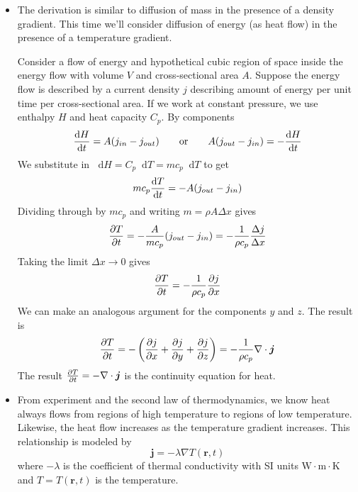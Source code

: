 \documentclass[11pt, a4paper]{article}
\newcommand{\eqtext}[1]{\qquad \text{#1} \qquad}
\newcommand{\diff}{\mathop{}\!\mathrm{d}} %
\begin{document}
\begin{itemize}
	\item The derivation is similar to diffusion of mass in the presence of a density gradient. This time we'll consider diffusion of energy (as heat flow) in the presence of a temperature gradient.
	
	
	Consider a flow of energy and hypothetical cubic region of space inside the energy flow with volume $ V $ and cross-sectional area $ A $. Suppose the energy flow is described by a current density $ j $ describing amount of energy per unit time per cross-sectional area. If we work at constant pressure, we use enthalpy $ H $ and heat capacity $ C_{p} $. By components
	\begin{equation*}
		\dv{H}{t} = A(j_{in} - j_{out}) \eqtext{or} A(j_{out} - j_{in}) = - \dv{H}{t}
	\end{equation*}
	We substitute in $ \diff H = C_{p} \diff T = m c_{p} \diff T$  to get
	\begin{equation*}
		m c_{p}\dv{T}{t}= - A(j_{out} - j_{in})
	\end{equation*}
	Dividing through by $ m c_{p} $ and writing $ m = \rho A \Delta x $ gives
	\begin{equation*}
		\pdv{T}{t} = - \frac{A}{mc_{p}}(j_{out} - j_{in}) = -\frac{1}{\rho c_{p}} \frac{\Delta j}{\Delta x}
	\end{equation*}
	Taking the limit $ \Delta x \to 0 $ gives
	\begin{equation*}
		\pdv{T}{t} = -\frac{1}{\rho c_{p}} \pdv{j}{x}
	\end{equation*}
	We can make an analogous argument for the components $ y $ and $ z $. The result is
	\begin{equation*}
		\pdv{T}{t} = - \left(\pdv{j}{x} + \pdv{j}{y} + \pdv{j}{z}\right) = - \frac{1}{\rho c_{p}} \nabla \cdot \bm{j}
	\end{equation*}
	The result $ \pdv{T}{t} = - \nabla \cdot \bm{j} $ is the continuity equation for heat.
	
	\item From experiment and the second law of thermodynamics, we know heat always flows from regions of high temperature to regions of low temperature. Likewise, the heat flow increases as the temperature gradient increases. This relationship is modeled by
	\begin{equation*}
		\bm{j} = - \lambda \nabla T(\bm{r}, t)
	\end{equation*}
	where $ - \lambda $ is the coefficient of thermal conductivity with SI units $ \si{\watt \cdot \meter \cdot \kelvin} $ and $ T = T(\bm{r}, t) $ is the temperature.
	

\end{itemize}
\end{document}
